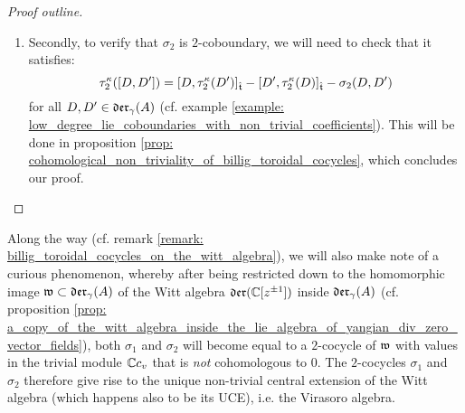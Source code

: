 \begin{proof}[Proof outline]
\begin{enumerate}
\begin{enumerate}
                        \item Secondly, to verify that $\sigma_2$ is $2$-coboundary, we will need to check that it satisfies:
                            $$\tau_2^{\kappa}([D, D']) = [ D, \tau_2^{\kappa}(D') ]_{\hat{\mathfrak{t}}} - [ D', \tau_2^{\kappa}(D) ]_{\hat{\mathfrak{t}}} - \sigma_2(D, D')$$
                        for all $D, D' \in \mathfrak{der}_{\gamma}(A)$ (cf. example \ref{example: low_degree_lie_coboundaries_with_non_trivial_coefficients}). This will be done in proposition \ref{prop: cohomological_non_triviality_of_billig_toroidal_cocycles}, which concludes our proof.
                    \end{enumerate}
                \end{enumerate}
            \end{proof}

        Along the way (cf. remark \ref{remark: billig_toroidal_cocycles_on_the_witt_algebra}), we will also make note of a curious phenomenon, whereby after being restricted down to the homomorphic image $\mathfrak{w} \subset \mathfrak{der}_{\gamma}(A)$ of the Witt algebra $\mathfrak{der}(\mathbb{C}[z^{\pm 1}])$ inside $\mathfrak{der}_{\gamma}(A)$ (cf. proposition \ref{prop: a_copy_of_the_witt_algebra_inside_the_lie_algebra_of_yangian_div_zero_vector_fields}), both $\sigma_1$ and $\sigma_2$ will become equal to a $2$-cocycle of $\mathfrak{w}$ with values in the trivial module $\mathbb{C} c_v$ that is \textit{not} cohomologous to $0$. The $2$-cocycles $\sigma_1$ and $\sigma_2$ therefore give rise to the unique non-trivial central extension of the Witt algebra (which happens also to be its UCE), i.e. the Virasoro algebra.
    
